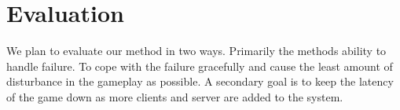 

\section{Evaluation}
\label{sec:evaluation}

We plan to evaluate our method in two ways. Primarily the methods ability to handle failure. To cope with the failure gracefully and cause the least amount of disturbance in the gameplay as possible. A secondary goal is to keep the latency of the game down as more clients and server are added to the system.
